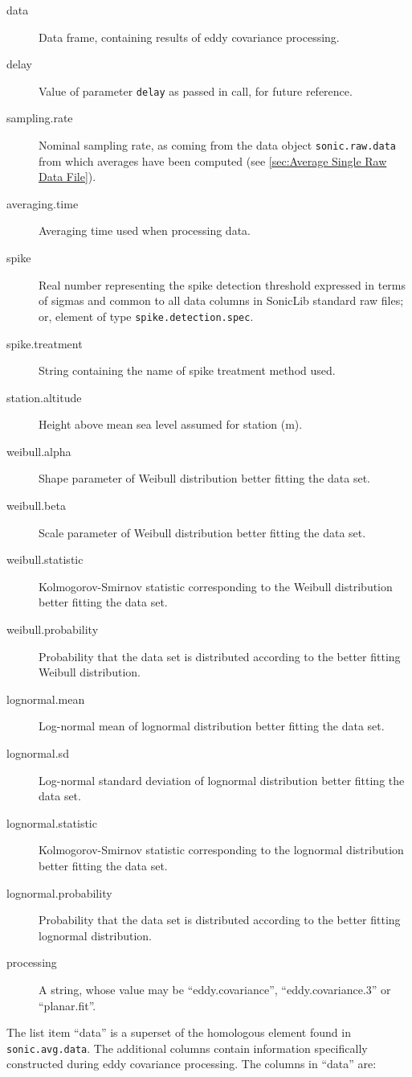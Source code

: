\documentclass[a4paper,10pt]{book}
\begin{document}
\begin{description}
 \item[data] Data frame, containing results of eddy covariance processing.
 \item[delay] Value of parameter \verb|delay| as passed in call, for future reference.
 \item[sampling.rate] Nominal sampling rate, as coming from the data object \verb|sonic.raw.data| from which averages have been computed (see \ref{sec:Average Single Raw Data File}).
 \item[averaging.time] Averaging time used when processing data.
 \item[spike] Real number representing the spike detection threshold expressed in terms of sigmas and common to all data columns in SonicLib standard raw files; or, element of type \verb|spike.detection.spec|.
 \item[spike.treatment] String containing the name of spike treatment method used.
 \item[station.altitude] Height above mean sea level assumed for station (m).
 \item[weibull.alpha] Shape parameter of Weibull distribution better fitting the data set.
 \item[weibull.beta] Scale parameter of Weibull distribution better fitting the data set.
 \item[weibull.statistic] Kolmogorov-Smirnov statistic corresponding to the Weibull distribution better fitting the data set.
 \item[weibull.probability] Probability that the data set is distributed according to the better fitting Weibull distribution.
 \item[lognormal.mean] Log-normal mean of lognormal distribution better fitting the data set.
 \item[lognormal.sd] Log-normal standard deviation of lognormal distribution better fitting the data set.
 \item[lognormal.statistic] Kolmogorov-Smirnov statistic corresponding to the lognormal distribution better fitting the data set.
 \item[lognormal.probability] Probability that the data set is distributed according to the better fitting lognormal distribution.
 \item[processing] A string, whose value may be ``eddy.covariance'', ``eddy.covariance.3'' or ``planar.fit''.
\end{description}

The list item ``data'' is a superset of the homologous element found in \verb|sonic.avg.data|. The additional columns contain information specifically constructed during eddy covariance processing. The columns in ``data'' are:
\end{document}

